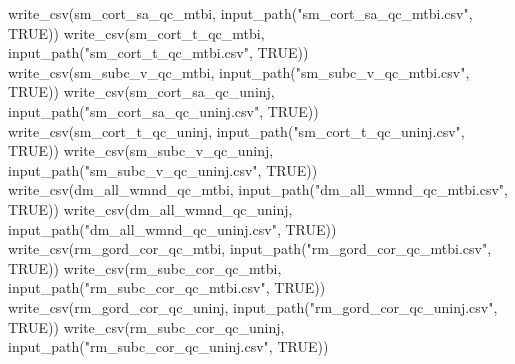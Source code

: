 \documentclass[
  letterpaper,
  DIV=11,
  numbers=noendperiod]{scrreprt}
\newenvironment{Shaded}{\begin{snugshade}}{\end{snugshade}}
\newcommand{\ConstantTok}[1]{\textcolor[rgb]{0.56,0.35,0.01}{#1}}
\newcommand{\FunctionTok}[1]{\textcolor[rgb]{0.28,0.35,0.67}{#1}}
\newcommand{\NormalTok}[1]{\textcolor[rgb]{0.00,0.23,0.31}{#1}}
\newcommand{\StringTok}[1]{\textcolor[rgb]{0.13,0.47,0.30}{#1}}
\begin{document}
\begin{Shaded}
\begin{Highlighting}[]
\FunctionTok{write\_csv}\NormalTok{(sm\_cort\_sa\_qc\_mtbi, }\FunctionTok{input\_path}\NormalTok{(}\StringTok{"sm\_cort\_sa\_qc\_mtbi.csv"}\NormalTok{, }\ConstantTok{TRUE}\NormalTok{))}
\FunctionTok{write\_csv}\NormalTok{(sm\_cort\_t\_qc\_mtbi, }\FunctionTok{input\_path}\NormalTok{(}\StringTok{"sm\_cort\_t\_qc\_mtbi.csv"}\NormalTok{, }\ConstantTok{TRUE}\NormalTok{))}
\FunctionTok{write\_csv}\NormalTok{(sm\_subc\_v\_qc\_mtbi, }\FunctionTok{input\_path}\NormalTok{(}\StringTok{"sm\_subc\_v\_qc\_mtbi.csv"}\NormalTok{, }\ConstantTok{TRUE}\NormalTok{))}
\FunctionTok{write\_csv}\NormalTok{(sm\_cort\_sa\_qc\_uninj, }\FunctionTok{input\_path}\NormalTok{(}\StringTok{"sm\_cort\_sa\_qc\_uninj.csv"}\NormalTok{, }\ConstantTok{TRUE}\NormalTok{))}
\FunctionTok{write\_csv}\NormalTok{(sm\_cort\_t\_qc\_uninj, }\FunctionTok{input\_path}\NormalTok{(}\StringTok{"sm\_cort\_t\_qc\_uninj.csv"}\NormalTok{, }\ConstantTok{TRUE}\NormalTok{))}
\FunctionTok{write\_csv}\NormalTok{(sm\_subc\_v\_qc\_uninj, }\FunctionTok{input\_path}\NormalTok{(}\StringTok{"sm\_subc\_v\_qc\_uninj.csv"}\NormalTok{, }\ConstantTok{TRUE}\NormalTok{))}
\FunctionTok{write\_csv}\NormalTok{(dm\_all\_wmnd\_qc\_mtbi, }\FunctionTok{input\_path}\NormalTok{(}\StringTok{"dm\_all\_wmnd\_qc\_mtbi.csv"}\NormalTok{, }\ConstantTok{TRUE}\NormalTok{))}
\FunctionTok{write\_csv}\NormalTok{(dm\_all\_wmnd\_qc\_uninj, }\FunctionTok{input\_path}\NormalTok{(}\StringTok{"dm\_all\_wmnd\_qc\_uninj.csv"}\NormalTok{, }\ConstantTok{TRUE}\NormalTok{))}
\FunctionTok{write\_csv}\NormalTok{(rm\_gord\_cor\_qc\_mtbi, }\FunctionTok{input\_path}\NormalTok{(}\StringTok{"rm\_gord\_cor\_qc\_mtbi.csv"}\NormalTok{, }\ConstantTok{TRUE}\NormalTok{))}
\FunctionTok{write\_csv}\NormalTok{(rm\_subc\_cor\_qc\_mtbi, }\FunctionTok{input\_path}\NormalTok{(}\StringTok{"rm\_subc\_cor\_qc\_mtbi.csv"}\NormalTok{, }\ConstantTok{TRUE}\NormalTok{))}
\FunctionTok{write\_csv}\NormalTok{(rm\_gord\_cor\_qc\_uninj, }\FunctionTok{input\_path}\NormalTok{(}\StringTok{"rm\_gord\_cor\_qc\_uninj.csv"}\NormalTok{, }\ConstantTok{TRUE}\NormalTok{))}
\FunctionTok{write\_csv}\NormalTok{(rm\_subc\_cor\_qc\_uninj, }\FunctionTok{input\_path}\NormalTok{(}\StringTok{"rm\_subc\_cor\_qc\_uninj.csv"}\NormalTok{, }\ConstantTok{TRUE}\NormalTok{))}
\end{Highlighting}
\end{Shaded}
\end{document}
